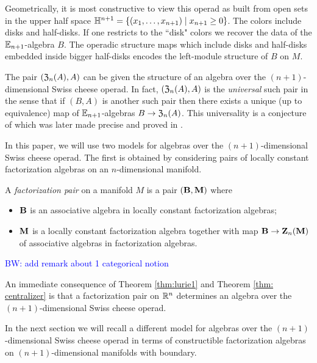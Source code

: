 \documentclass[11pt]{amsart}
\numberwithin{equation}{section}
\def\brian{\textcolor{blue}{BW: }\textcolor{blue}}
\begin{document}
Geometrically, it is most constructive to view this operad as built from open sets in the upper half space $\mathbb H^{n+1} = \{(x_1,\ldots, x_{n+1}) \; | \; x_{n+1} \geq 0\}$.
The colors include disks and half-disks. 
If one restricts to the ``disk" colors we recover the data of the $\mathbb E_{n+1}$-algebra $B$. 
The operadic structure maps which include disks and half-disks embedded inside bigger half-disks encodes the left-module structure of $B$ on $M$.

The pair $(\mathfrak Z_{n} (A), A)$ can be given the structure of an algebra over the $(n+1)$-dimensional Swiss cheese operad. 
In fact, $(\mathfrak Z_{n} (A), A)$ is the {\em universal} such pair in the sense that if $(B, A)$ is another such pair then there exists a unique (up to equivalence) map of $\mathbb E_{n+1}$-algebras $B \to \mathfrak Z_n(A)$. 
This universality is a conjecture of \cite{Kontsevich} which was later made precise and proved in \cite{Thomas, Tamarkin, Dolgushev, jnkf others?}. 

In this paper, we will use two models for algebras over the $(n+1)$-dimensional Swiss cheese operad. 
The first is obtained by considering pairs of locally constant factorization algebras on an $n$-dimensional manifold. 

\begin{dfn}\label{dfn:pair}
A {\em factorization pair} on a manifold $M$ is a pair $(\mathbf B, \mathbf M)$ where
\begin{itemize}
\item $\mathbf B$ is an associative algebra in locally constant factorization algebras;
\item $\mathbf M$ is a locally constant factorization algebra together with map $\mathbf B \to \mathbf Z_n(\mathbf M)$ of associative algebras in factorization algebras.
\end{itemize}
\brian{add remark about 1 categorical notion}
\end{dfn}

An immediate consequence of Theorem \ref{thm:lurie1} and Theorem \ref{thm: centralizer} is that a factorization pair on $\mathbb R^n$ determines an algebra over the $(n+1)$-dimensional Swiss cheese operad. 

In the next section we will recall a different model for algebras over the $(n+1)$-dimensional Swiss cheese operad in terms of constructible factorization algebras on $(n+1)$-dimensional manifolds with boundary. 

%
%
\end{document}
